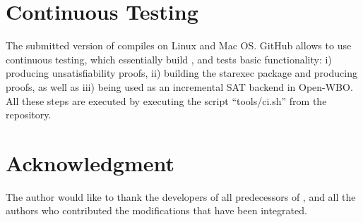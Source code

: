\documentclass[conference]{IEEEtran}
\begin{document}
\section{Continuous Testing}

The submitted version of \mergesat compiles on Linux and Mac OS.
GitHub allows to use continuous testing, which essentially build \mergesat, and tests basic functionality:
i) producing unsatisfiability proofs, ii) building the starexec package and producing proofs, as well as iii) being used as an incremental SAT backend in Open-WBO.
All these steps are executed by executing the script ``tools/ci.sh'' from the repository.

\section*{Acknowledgment}

The author would like to thank the developers of all predecessors of \mergesat, and all the authors who contributed the modifications that have been integrated.



\end{document}

